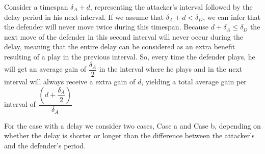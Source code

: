 Consider a timespan $\delta_{A} + d$, representing the attacker's interval followed by the delay period in his next interval. If we assume that $\delta_{A}+d<\delta_{D}$, we can infer that the defender will never move twice during this timespan.
Because $d + \delta_{A} \leq \delta_{D}$ the next move of the defender in this second interval will never occur during the delay, meaning that the entire delay can be considered as an extra benefit resulting of a play in the previous interval. 
So, every time the defender plays, he will get an average gain of $\dfrac{\delta_{A}}{2}$ in the interval where he plays and in the next interval will always receive a extra gain of $d$, yielding a total average gain per interval of
$\dfrac{(d+\dfrac{\delta_{A}}{2})}{\delta_{A}}$

For the case with a delay we consider two cases, Case a and Case b, depending on whether the delay is shorter or longer than the difference between the attacker's and the defender's period.  \\

